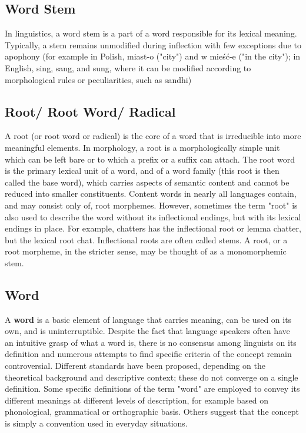 \subsection{Word Stem \cite{wiki-word-stem}}\label{word-stem}
In linguistics, a word stem is a part of a word responsible for its lexical meaning. Typically, a stem remains unmodified during inflection with few exceptions due to apophony (for example in Polish, miast-o ("city") and w mieść-e ("in the city"); in English, sing, sang, and sung, where it can be modified according to morphological rules or peculiarities, such as sandhi)


\subsection{Root/ Root Word/ Radical \cite{wiki-root-word}}\label{root-word}
A root (or root word or radical) is the core of a word that is irreducible into more meaningful elements. In morphology, a root is a morphologically simple unit which can be left bare or to which a prefix or a suffix can attach. The root word is the primary lexical unit of a word, and of a word family (this root is then called the base word), which carries aspects of semantic content and cannot be reduced into smaller constituents. Content words in nearly all languages contain, and may consist only of, root morphemes. However, sometimes the term "root" is also used to describe the word without its inflectional endings, but with its lexical endings in place. For example, chatters has the inflectional root or lemma chatter, but the lexical root chat. Inflectional roots are often called stems. A root, or a root morpheme, in the stricter sense, may be thought of as a monomorphemic stem.



\subsection{Word \cite{wiki-word}}\label{Language: word}
A \textbf{word} is a basic element of language that carries meaning, can be used on its own, and is uninterruptible. Despite the fact that language speakers often have an intuitive grasp of what a word is, there is no consensus among linguists on its definition and numerous attempts to find specific criteria of the concept remain controversial. Different standards have been proposed, depending on the theoretical background and descriptive context; these do not converge on a single definition. Some specific definitions of the term "word" are employed to convey its different meanings at different levels of description, for example based on phonological, grammatical or orthographic basis. Others suggest that the concept is simply a convention used in everyday situations.


